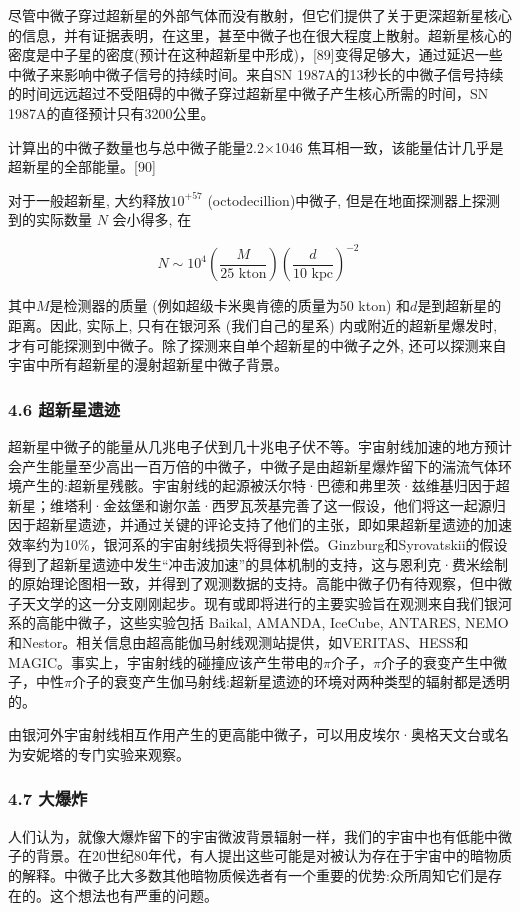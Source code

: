 尽管中微子穿过超新星的外部气体而没有散射，但它们提供了关于更深超新星核心的信息，并有证据表明，在这里，甚至中微子也在很大程度上散射。超新星核心的密度是中子星的密度(预计在这种超新星中形成)，[89]变得足够大，通过延迟一些中微子来影响中微子信号的持续时间。来自SN 1987A的13秒长的中微子信号持续的时间远远超过不受阻碍的中微子穿过超新星中微子产生核心所需的时间，SN 1987A的直径预计只有3200公里。

计算出的中微子数量也与总中微子能量2.2×1046 焦耳相一致，该能量估计几乎是超新星的全部能量。[90]

对于一般超新星, 大约释放$10^{+57}$ (octodecillion)中微子, 但是在地面探测器上探测到的实际数量 $N$ 会小得多, 在

$$N \sim 10^4 \left( \frac{M}{25\text{ kton}} \right) \left( \frac{d}{10\text{ kpc}}\right)^{-2}~$$

其中$M$是检测器的质量 (例如超级卡米奥肯德的质量为50 kton) 和$d$是到超新星的距离。因此, 实际上, 只有在银河系 (我们自己的星系) 内或附近的超新星爆发时, 才有可能探测到中微子。除了探测来自单个超新星的中微子之外, 还可以探测来自宇宙中所有超新星的漫射超新星中微子背景。

\subsubsection{4.6 超新星遗迹}
超新星中微子的能量从几兆电子伏到几十兆电子伏不等。宇宙射线加速的地方预计会产生能量至少高出一百万倍的中微子，中微子是由超新星爆炸留下的湍流气体环境产生的:超新星残骸。宇宙射线的起源被沃尔特·巴德和弗里茨·兹维基归因于超新星；维塔利·金兹堡和谢尔盖·西罗瓦茨基完善了这一假设，他们将这一起源归因于超新星遗迹，并通过关键的评论支持了他们的主张，即如果超新星遗迹的加速效率约为10\%，银河系的宇宙射线损失将得到补偿。Ginzburg和Syrovatskii的假设得到了超新星遗迹中发生“冲击波加速”的具体机制的支持，这与恩利克·费米绘制的原始理论图相一致，并得到了观测数据的支持。高能中微子仍有待观察，但中微子天文学的这一分支刚刚起步。现有或即将进行的主要实验旨在观测来自我们银河系的高能中微子，这些实验包括 Baikal, AMANDA, IceCube, ANTARES, NEMO 和Nestor。相关信息由超高能伽马射线观测站提供，如VERITAS、HESS和MAGIC。事实上，宇宙射线的碰撞应该产生带电的$\pi$介子，$\pi$介子的衰变产生中微子，中性$\pi$介子的衰变产生伽马射线:超新星遗迹的环境对两种类型的辐射都是透明的。

由银河外宇宙射线相互作用产生的更高能中微子，可以用皮埃尔·奥格天文台或名为安妮塔的专门实验来观察。

\subsubsection{4.7 大爆炸}
人们认为，就像大爆炸留下的宇宙微波背景辐射一样，我们的宇宙中也有低能中微子的背景。在20世纪80年代，有人提出这些可能是对被认为存在于宇宙中的暗物质的解释。中微子比大多数其他暗物质候选者有一个重要的优势:众所周知它们是存在的。这个想法也有严重的问题。


